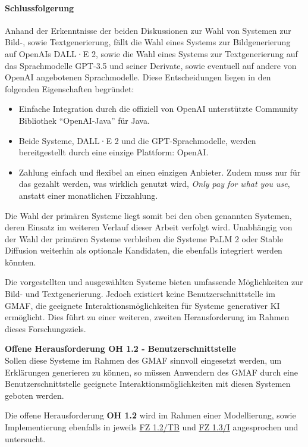 \paragraph{Schlussfolgerung}
Anhand der Erkenntnisse der beiden Diskussionen zur Wahl von Systemen zur Bild-, sowie Textgenerierung, fällt die Wahl eines Systems zur Bildgenerierung auf OpenAIs DALL·E 2, sowie die Wahl eines Systems zur Textgenerierung auf das Sprachmodelle GPT-3.5 und seiner Derivate, sowie eventuell auf andere von OpenAI angebotenen Sprachmodelle.
Diese Entscheidungen liegen in den folgenden Eigenschaften begründet:
\begin{itemize}
    \item Einfache Integration durch die offiziell von OpenAI unterstützte Community Bibliothek \enquote{OpenAI-Java} \cite{dall-e-java-api} für Java.
    \item Beide Systeme, DALL·E 2 und die GPT-Sprachmodelle, werden bereitgestellt durch eine einzige Plattform: OpenAI.
    \item Zahlung einfach und flexibel an einen einzigen Anbieter.
    Zudem muss nur für das gezahlt werden, was wirklich genutzt wird, \textit{Only pay for what you use}, anstatt einer monatlichen Fixzahlung.
\end{itemize}
Die Wahl der primären Systeme liegt somit bei den oben genannten Systemen, deren Einsatz im weiteren Verlauf dieser Arbeit verfolgt wird.
Unabhängig von der Wahl der primären Systeme verbleiben die Systeme PaLM 2 oder Stable Diffusion weiterhin als optionale Kandidaten, die ebenfalls integriert werden könnten.

Die vorgestellten und ausgewählten Systeme bieten umfassende Möglichkeiten zur Bild- und Textgenerierung.
Jedoch existiert keine Benutzerschnittstelle im GMAF, die geeignete Interaktionsmöglichkeiten für Systeme generativer KI ermöglicht.
Dies führt zu einer weiteren, zweiten Herausforderung im Rahmen dieses Forschungsziels.

\begin{tcolorbox}[minipage, colback=white, colframe=black, arc=0pt, outer arc=0pt]
    \textbf{Offene Herausforderung OH 1.2 - Benutzerschnittstelle} \\
    Sollen diese Systeme im Rahmen des GMAF sinnvoll eingesetzt werden, um Erklärungen generieren zu können, so müssen Anwendern des GMAF durch eine Benutzerschnittstelle geeignete Interaktionsmöglichkeiten mit diesen Systemen geboten werden.
\end{tcolorbox}
Die offene Herausforderung \textbf{OH 1.2} wird im Rahmen einer Modellierung, sowie Implementierung ebenfalls in jeweils \hyperref[sec3:model:subsec:fz-explainability]{FZ 1.2/TB} und \hyperref[sec4:impl:subsec:fz-explainability]{FZ 1.3/I} angesprochen und untersucht.


